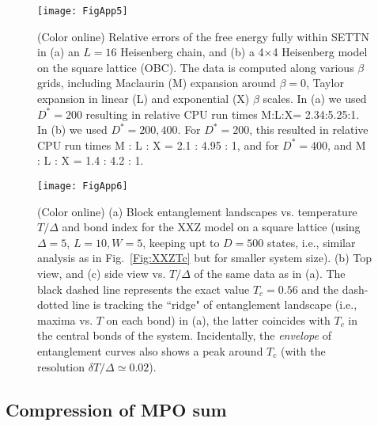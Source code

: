 \documentclass[aps,prx,twocolumn,showpacs,psfig,superscriptaddress,longbibliography]{revtex4-1}
\newcommand{\Fig}[1]{Fig.~\ref{#1}}
\def\Dstar{D^\ast}
\def\Tc{\ensuremath{T_c}\xspace}
\begin{document}
\begin{figure}%
\texttt{[image: FigApp5]}
\caption{ (Color online)
   Relative errors of the free energy fully within SETTN in (a) an
   $L=16$ Heisenberg chain, and (b) a 4$\times$4 Heisenberg model
   on the square lattice (OBC). The data is computed along various
   $\beta$ grids, including Maclaurin (M) expansion around
   $\beta=0$, Taylor expansion in linear (L) and exponential (X)
   $\beta$ scales.  In (a) we used $\Dstar=200$
   resulting in relative CPU run times M:L:X= 2.34:5.25:1.
   In (b) we used $\Dstar=200, 400$.
   For $\Dstar=200$, this resulted in 
   relative CPU run times M : L : X = 2.1 : 4.95 : 1,
   and for $\Dstar=400$, and M : L : X = 1.4 : 4.2 : 1.
}
\label{Fig:CompSETTN}
\end{figure}


\begin{figure*}
\centering
  \texttt{[image: FigApp6]}
\caption{(Color online) 
(a) Block entanglement landscapes vs.  temperature $T/\Delta$ and
   bond index for the XXZ model on a square lattice (using
   $\Delta=5$, $L=10, W=5$, keeping upt to $D=500$ states, i.e.,
   similar analysis as in \Fig{Fig:XXZTc} but for smaller system
   size).
(b) Top view, and (c) side view vs. $T/\Delta$ of the
   same data as in (a).  The black dashed line represents the exact
   value $\Tc=0.56$ and the dash-dotted line is tracking the
   ``ridge" of entanglement landscape (i.e., maxima vs. $T$ on each
   bond) in (a), the latter coincides with $\Tc$ in the central
   bonds of the system.  Incidentally, the {\it envelope} of
   entanglement curves also shows a peak around $\Tc$ (with the
   resolution $\delta T/\Delta \simeq 0.02$).
}
\label{Fig:XXZCyl}
\end{figure*}

\subsection{Compression of MPO sum
  \label{sec:compress:sum}}
\end{document}
